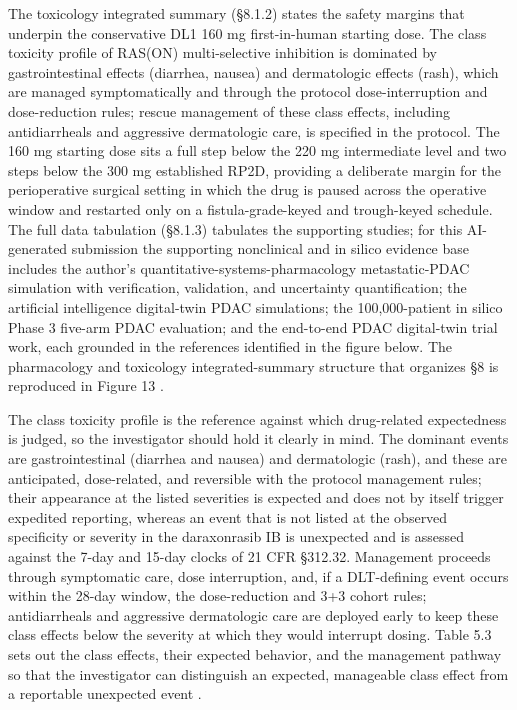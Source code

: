 The toxicology integrated summary (\S 8.1.2) states the safety margins that
underpin the conservative DL1 160 mg first-in-human starting dose. The class
toxicity profile of RAS(ON) multi-selective inhibition is dominated by
gastrointestinal effects (diarrhea, nausea) and dermatologic effects (rash), which
are managed symptomatically and through the protocol dose-interruption and
dose-reduction rules; rescue management of these class effects, including
antidiarrheals and aggressive dermatologic care, is specified in the protocol. The
160 mg starting dose sits a full step below the 220 mg intermediate level and two
steps below the 300 mg established RP2D, providing a deliberate margin for the
perioperative surgical setting in which the drug is paused across the operative
window and restarted only on a fistula-grade-keyed and trough-keyed schedule. The
full data tabulation (\S 8.1.3) tabulates the supporting studies; for this
AI-generated submission the supporting nonclinical and in silico evidence base
includes the author's quantitative-systems-pharmacology metastatic-PDAC simulation
with verification, validation, and uncertainty quantification; the artificial
intelligence digital-twin PDAC simulations; the 100,000-patient in silico Phase 3
five-arm PDAC evaluation; and the end-to-end PDAC digital-twin trial work, each
grounded in the references identified in the figure below. The pharmacology and
toxicology integrated-summary structure that organizes \S 8 is reproduced in
Figure 13 \cite{qspmetpancre,fdadigtwinpc,pdacdigtwinp,chatgpt100kp}.

The class toxicity profile is the reference against which drug-related expectedness
is judged, so the investigator should hold it clearly in mind. The dominant events
are gastrointestinal (diarrhea and nausea) and dermatologic (rash), and these are
anticipated, dose-related, and reversible with the protocol management rules; their
appearance at the listed severities is expected and does not by itself trigger
expedited reporting, whereas an event that is not listed at the observed specificity
or severity in the daraxonrasib IB is unexpected and is assessed against the 7-day
and 15-day clocks of 21 CFR \S 312.32. Management proceeds through symptomatic
care, dose interruption, and, if a DLT-defining event occurs within the 28-day
window, the dose-reduction and 3+3 cohort rules; antidiarrheals and aggressive
dermatologic care are deployed early to keep these class effects below the severity
at which they would interrupt dosing. Table 5.3 sets out the class effects, their
expected behavior, and the management pathway so that the investigator can
distinguish an expected, manageable class effect from a reportable unexpected event
\cite{daraxwhipple,ichpaistduni}.

